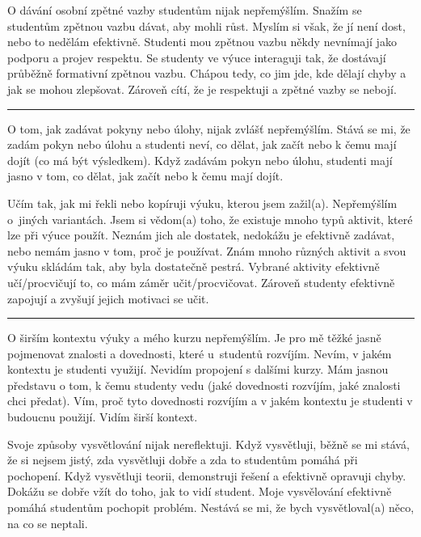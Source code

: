 \newpage
{}
{O dávání osobní zpětné vazby studentům nijak nepřemýšlím.}
{Snažím se studentům zpětnou vazbu dávat, aby mohli růst. Myslím si však, že jí není dost, nebo to nedělám efektivně. Studenti mou zpětnou vazbu někdy nevnímají jako podporu a projev respektu.}
{Se studenty ve výuce interaguji tak, že dostávají průběžně formativní zpětnou vazbu. Chápou tedy, co jim jde, kde dělají chyby a jak se mohou zlepšovat. Zároveň cítí, že je respektuji a zpětné vazby se nebojí.}

\rule{\textwidth}{0.4pt}
{O tom, jak zadávat pokyny nebo úlohy, nijak zvlášť nepřemýšlím.}
{Stává se mi, že zadám pokyn nebo úlohu a studenti neví, co dělat, jak začít nebo k čemu mají dojít (co má být výsledkem).}
{Když zadávám pokyn nebo úlohu, studenti mají jasno v tom, co dělat, jak začít nebo k čemu mají dojít.}

\newpage
{}
{Učím tak, jak mi řekli nebo kopíruji výuku, kterou jsem zažil(a). Nepřemýšlím o~jiných variantách.}
{Jsem si vědom(a) toho, že existuje mnoho typů aktivit, které lze při výuce použít. Neznám jich ale dostatek, nedokážu je efektivně zadávat, nebo nemám jasno v tom, proč je používat.}
{Znám mnoho různých aktivit a svou výuku skládám tak, aby byla dostatečně pestrá. Vybrané aktivity efektivně učí/procvičují to, co mám záměr učit/procvičovat. Zároveň studenty efektivně zapojují a zvyšují jejich motivaci se učit.}

\rule{\textwidth}{0.4pt}
{O širším kontextu výuky a mého kurzu nepřemýšlím.}
{Je pro mě těžké jasně pojmenovat znalosti a dovednosti, které u~studentů rozvíjím. Nevím, v jakém kontextu je studenti využijí. Nevidím propojení s dalšími kurzy.}
{Mám jasnou představu o tom, k čemu studenty vedu (jaké dovednosti rozvíjím, jaké znalosti chci předat). Vím, proč tyto dovednosti rozvíjím a v jakém kontextu je studenti v budoucnu použijí. Vidím širší kontext.}
\vspace*{-1em}

\newpage
{}
{Svoje způsoby vysvětlování nijak nereflektuji.}
{Když vysvětluji, běžně se mi stává, že si nejsem jistý, zda vysvětluji dobře a zda to studentům pomáhá při pochopení.}
{Když vysvětluji teorii, demonstruji řešení a efektivně opravuji chyby. Dokážu se dobře vžít do toho, jak to vidí student. Moje vysvělování efektivně pomáhá studentům pochopit problém. Nestává se mi, že bych vysvětloval(a) něco, na co se neptali.}

